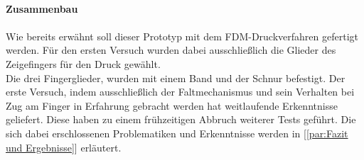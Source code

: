 \documentclass[titlepage,12pt,twoside]{article}
\begin{document}
\\
\textbf{Zusammenbau} \\
\\
Wie bereits erwähnt soll dieser Prototyp mit dem FDM-Druckverfahren gefertigt 
werden. Für den ersten Versuch wurden dabei ausschließlich die Glieder des 
Zeigefingers für den Druck gewählt. \\
Die drei Fingerglieder, wurden mit einem Band und der Schnur befestigt. 
Der erste Versuch, indem ausschließlich der Faltmechanismus und sein 
Verhalten bei Zug am Finger in Erfahrung gebracht werden hat weitlaufende 
Erkenntnisse geliefert. Diese haben zu einem frühzeitigen Abbruch weiterer 
Tests geführt. Die sich dabei erschlossenen Problematiken und Erkenntnisse 
werden in [\textcolor{blue}{\autoref{par:Fazit und Ergebnisse}}] erläutert. \\
\\
\end{document}
